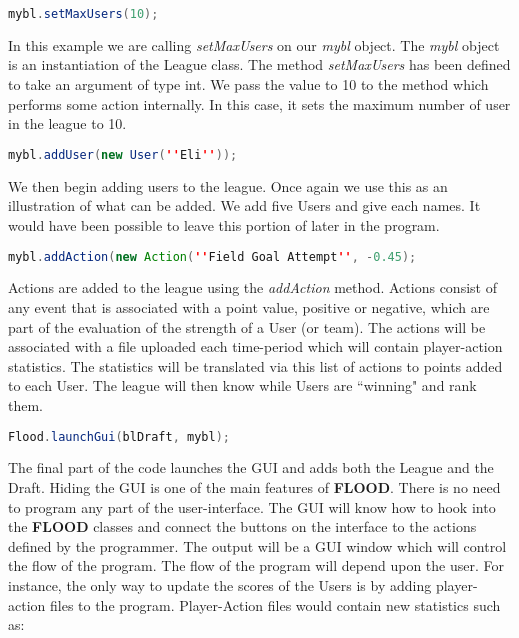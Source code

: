 \documentclass[12pt]{report}
\begin{document}
\begin{lstlisting}[language=Java,label=some-code,caption=Setting maximum users]
mybl.setMaxUsers(10);
\end{lstlisting}

\begin{doublespace}
In this example we are calling \textit{setMaxUsers} on our \textit{mybl} object. The \textit{mybl} object is an instantiation of the League class. The method \textit{setMaxUsers} has been defined to take an argument of type int. We pass the value to 10 to the method which performs some action internally. In this case, it sets the maximum number of user in the league to 10.
\end{doublespace}

\begin{lstlisting}[language=Java,label=some-code,caption=Adding a User]
mybl.addUser(new User(''Eli''));
\end{lstlisting}

\begin{doublespace}
We then begin adding users to the league. Once again we use this as an illustration of what can be added. We add five Users and give each names. It would have been possible to leave this portion of later in the program.
\end{doublespace}

\begin{lstlisting}[language=Java,label=some-code,caption=Adding an Action]
mybl.addAction(new Action(''Field Goal Attempt'', -0.45);
\end{lstlisting}

\begin{doublespace}
Actions are added to the league using the \textit{addAction} method. Actions consist of any event that is associated with a point value, positive or negative, which are part of the evaluation of the strength of a User (or team). The actions will be associated with a file uploaded each time-period which will contain player-action statistics. The statistics will be translated via this list of actions to points added to each User. The league will then know while Users are ``winning" and rank them. 
\end{doublespace}

\begin{lstlisting}[language=Java,label=some-code,caption=Launching the GUI]
Flood.launchGui(blDraft, mybl);
\end{lstlisting}

\begin{doublespace}
The final part of the code launches the GUI and adds both the League and the Draft. Hiding the GUI is one of the main features of \textbf{FLOOD}. There is no need to program any part of the user-interface. The GUI will know how to hook into the \textbf{FLOOD} classes and connect the buttons on the interface to the actions defined by the programmer. The output will be a GUI window which will control the flow of the program. The flow of the program will depend upon the user. For instance, the only way to update the scores of the Users is by adding player-action files to the program. Player-Action files would contain new statistics such as:
\end{doublespace}
\end{document}
